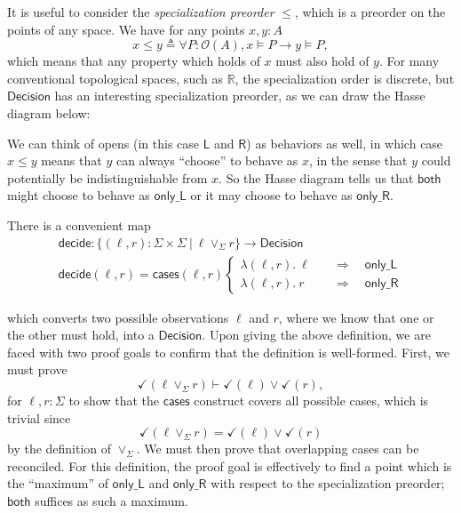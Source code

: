 \documentclass{article}           %
\newcommand{\R}{\mathbb{R}}
\newcommand{\fun}[2]{\lambda {#1}.\  {#2}}
\newcommand{\suchthat}{\ |\ }
\newcommand{\Open}[1]{\mathcal{O}({#1})}
\newcommand{\defeq}{\triangleq}
\begin{document}
It is useful to consider the \emph{specialization preorder} $\le$, which is a preorder on the points of any space. We have for any points $x, y : A$
\[
x \le y \defeq \forall P : \Open{A}, x \models P \to y \models P,
\]
which means that any property which holds of $x$ must also hold of $y$. For many conventional topological spaces, such as $\R$, the specialization order is discrete, but $\mathsf{Decision}$ has an interesting specialization preorder, as we can draw the Hasse diagram below:
\begin{center}
\end{center}

We can think of opens (in this case $\mathsf{L}$ and $\mathsf{R}$) as behaviors as well, in which case $x \le y$ means that $y$ can always ``choose'' to behave as $x$, in the sense that $y$ could potentially be indistinguishable from $x$. So the Hasse diagram tells us that $\mathsf{both}$ might choose to behave as $\mathsf{only\_L}$ or it may choose to behave as $\mathsf{only\_R}$.

There is a convenient map
\begin{align*}
\mathsf{decide} : \{ (\ell, r) : \Sigma \times \Sigma \suchthat \ell \vee_\Sigma r \} \to \mathsf{Decision}
\\ \mathsf{decide}(\ell, r) = \mathsf{cases}(\ell, r)
\begin{cases}
\fun{(\ell, r)}{\ell}
  \quad &\Longrightarrow \quad \mathsf{only\_L}
\\
\fun{(\ell, r)}{r}
  \quad &\Longrightarrow \quad \mathsf{only\_R}
\end{cases}
\end{align*}

which converts two possible observations $\ell$ and $r$, where we know that one or the other must hold, into a $\mathsf{Decision}$. Upon giving the above definition, we are faced with two proof goals to confirm that the definition is well-formed. First, we must prove
\[
\checkmark(\ell \vee_\Sigma r) \vdash \checkmark(\ell) \vee \checkmark(r),
\]
for $\ell, r : \Sigma$ to show that the $\mathsf{cases}$ construct covers all possible cases, which is trivial since
\[
\checkmark(\ell \vee_\Sigma r) = \checkmark(\ell) \vee \checkmark(r)
\]
by the definition of $\vee_\Sigma$. We must then prove that overlapping cases can be reconciled. For this definition, the proof goal is effectively to find a point which is the ``maximum'' of $\mathsf{only\_L}$ and $\mathsf{only\_R}$ with respect to the specialization preorder; $\mathsf{both}$ suffices as such a maximum.
\end{document}

